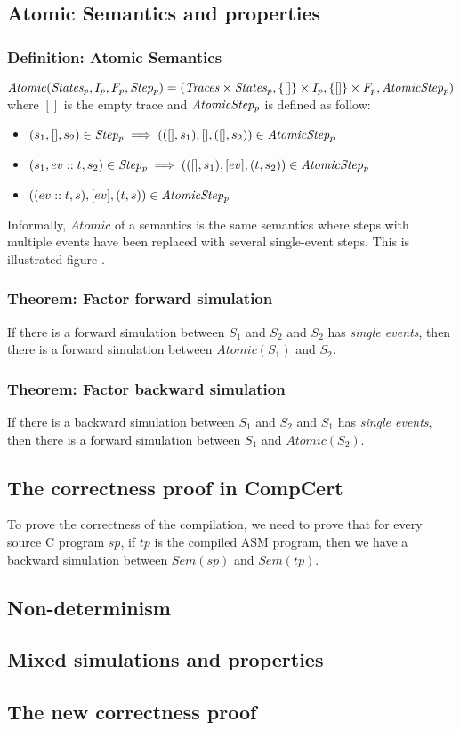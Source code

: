 \subsection{Atomic Semantics and properties}
\subsubsection{Definition: Atomic Semantics} $\mathit{Atomic}(\mathit{States_{p}},I_p,F_p,\mathit{Step_{p}}) = (\mathit{Traces}\times\mathit{States_{p}},\{[]\}\times I_p,\{[]\}\times F_p,\mathit{AtomicStep_{p}})$ where $[]$ is the empty trace and $\mathit{AtomicStep_{p}}$ is defined as follow:
\begin{itemize}
\item $(s_1,[],s_2)\in\mathit{Step_{p}}\implies(([],s_1),[],([],s_2))\in\mathit{AtomicStep_{p}}$
\item $(s_1,ev::t,s_2)\in\mathit{Step_{p}}\implies(([],s_1),[ev],(t,s_2))\in\mathit{AtomicStep_{p}}$
\item $((ev::t,s),[ev],(t,s))\in\mathit{AtomicStep_{p}}$
\end{itemize}
Informally, $\mathit{Atomic}$ of a semantics is the same semantics where steps with multiple events have been replaced with several single-event steps. This is illustrated figure .

\subsubsection{Theorem: Factor forward simulation} If there is a forward simulation between $S_1$ and $S_2$ and $S_2$ has \textit{single events}, then there is a forward simulation between $\mathit{Atomic}(S_1)$ and $S_2$.

\subsubsection{Theorem: Factor backward simulation} If there is a backward simulation between $S_1$ and $S_2$ and $S_1$ has \textit{single events}, then there is a forward simulation between $S_1$ and $\mathit{Atomic}(S_2)$.

\subsection{The correctness proof in CompCert}
To prove the correctness of the compilation, we need to prove that for every source C program $sp$, if $tp$ is the compiled ASM program, then we have a backward simulation between $\mathit{Sem}(sp)$ and $\mathit{Sem}(tp)$.


\subsection{Non-determinism}
\subsection{Mixed simulations and properties}
\subsection{The new correctness proof}

